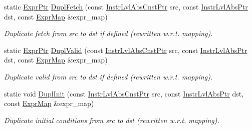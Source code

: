 \begin{DoxyCompactItemize}
\mbox{\label{classilang_1_1_abs_knob_a6eead94ae14da78e4b3c3d7d10ca4bee}} 
static \mbox{\hyperlink{namespaceilang_a7c4196c72e53ea4df4b7861af7bc3bce}{Expr\+Ptr}} \mbox{\hyperlink{classilang_1_1_abs_knob_a6eead94ae14da78e4b3c3d7d10ca4bee}{Dupl\+Fetch}} (const \mbox{\hyperlink{namespaceilang_adc86156b73aa1a4b6369645e9b96ff19}{Instr\+Lvl\+Abs\+Cnst\+Ptr}} src, const \mbox{\hyperlink{namespaceilang_ad1b30fdf347e493b3937143da05d1a72}{Instr\+Lvl\+Abs\+Ptr}} dst, const \mbox{\hyperlink{namespaceilang_ad40e6475e04844bcad9c380aac0b215c}{Expr\+Map}} \&expr\+\_\+map)
\begin{DoxyCompactList}\small\item\em Duplicate fetch from src to dst if defined (rewritten w.\+r.\+t. mapping). \end{DoxyCompactList}\item 
\mbox{\label{classilang_1_1_abs_knob_a8dbaaf6694262be48d716f7eff4a6e02}} 
static \mbox{\hyperlink{namespaceilang_a7c4196c72e53ea4df4b7861af7bc3bce}{Expr\+Ptr}} \mbox{\hyperlink{classilang_1_1_abs_knob_a8dbaaf6694262be48d716f7eff4a6e02}{Dupl\+Valid}} (const \mbox{\hyperlink{namespaceilang_adc86156b73aa1a4b6369645e9b96ff19}{Instr\+Lvl\+Abs\+Cnst\+Ptr}} src, const \mbox{\hyperlink{namespaceilang_ad1b30fdf347e493b3937143da05d1a72}{Instr\+Lvl\+Abs\+Ptr}} dst, const \mbox{\hyperlink{namespaceilang_ad40e6475e04844bcad9c380aac0b215c}{Expr\+Map}} \&expr\+\_\+map)
\begin{DoxyCompactList}\small\item\em Duplicate valid from src to dst if defined (rewritten w.\+r.\+t. mapping). \end{DoxyCompactList}\item 
\mbox{\label{classilang_1_1_abs_knob_a0e551b9f8c7bec416b124660a8c5942d}} 
static void \mbox{\hyperlink{classilang_1_1_abs_knob_a0e551b9f8c7bec416b124660a8c5942d}{Dupl\+Init}} (const \mbox{\hyperlink{namespaceilang_adc86156b73aa1a4b6369645e9b96ff19}{Instr\+Lvl\+Abs\+Cnst\+Ptr}} src, const \mbox{\hyperlink{namespaceilang_ad1b30fdf347e493b3937143da05d1a72}{Instr\+Lvl\+Abs\+Ptr}} dst, const \mbox{\hyperlink{namespaceilang_ad40e6475e04844bcad9c380aac0b215c}{Expr\+Map}} \&expr\+\_\+map)
\begin{DoxyCompactList}\small\item\em Duplicate initial conditions from src to dst (rewritten w.\+r.\+t. mapping). \end{DoxyCompactList}\item 

\end{DoxyCompactItemize}
